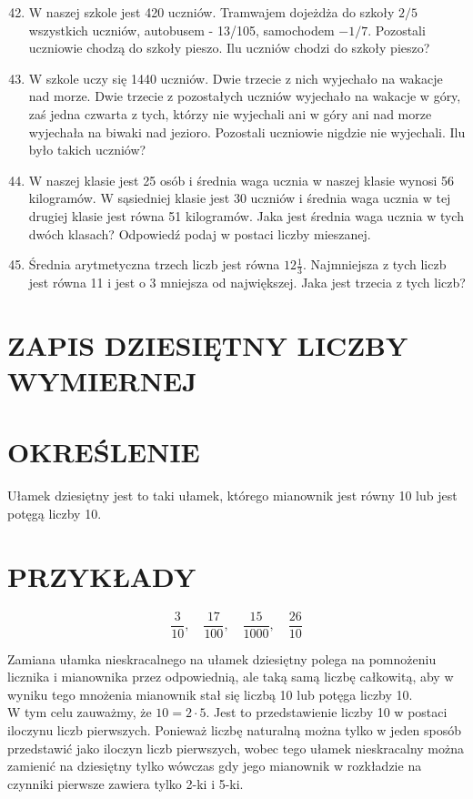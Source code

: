 \documentclass[10pt]{article}
\begin{document}
\begin{enumerate}
  \setcounter{enumi}{41}
  \item W naszej szkole jest 420 uczniów. Tramwajem dojeżdża do szkoły \(2 / 5\) wszystkich uczniów, autobusem - 13/105, samochodem \(-1 / 7\). Pozostali uczniowie chodzą do szkoły pieszo. Ilu uczniów chodzi do szkoły pieszo?
  \item W szkole uczy się 1440 uczniów. Dwie trzecie z nich wyjechało na wakacje nad morze. Dwie trzecie z pozostałych uczniów wyjechało na wakacje w góry, zaś jedna czwarta z tych, którzy nie wyjechali ani w góry ani nad morze wyjechała na biwaki nad jezioro. Pozostali uczniowie nigdzie nie wyjechali. Ilu było takich uczniów?
  \item W naszej klasie jest 25 osób i średnia waga ucznia w naszej klasie wynosi 56 kilogramów. W sąsiedniej klasie jest 30 uczniów i średnia waga ucznia w tej drugiej klasie jest równa 51 kilogramów. Jaka jest średnia waga ucznia w tych dwóch klasach? Odpowiedź podaj w postaci liczby mieszanej.
  \item Średnia arytmetyczna trzech liczb jest równa \(12 \frac{1}{3}\). Najmniejsza z tych liczb jest równa 11 i jest o 3 mniejsza od największej. Jaka jest trzecia z tych liczb?
\end{enumerate}

\section*{ZAPIS DZIESIĘTNY LICZBY WYMIERNEJ}
\section*{OKREŚLENIE}
Ułamek dziesiętny jest to taki ułamek, którego mianownik jest równy 10 lub jest potęgą liczby 10.

\section*{PRZYKŁADY}
\[
\frac{3}{10}, \quad \frac{17}{100}, \quad \frac{15}{1000}, \quad \frac{26}{10}
\]

Zamiana ułamka nieskracalnego na ułamek dziesiętny polega na pomnożeniu licznika i mianownika przez odpowiednią, ale taką samą liczbę całkowitą, aby w wyniku tego mnożenia mianownik stał się liczbą 10 lub potęga liczby 10.\\
W tym celu zauważmy, że \(10=2 \cdot 5\). Jest to przedstawienie liczby 10 w postaci iloczynu liczb pierwszych. Ponieważ liczbę naturalną można tylko w jeden sposób przedstawić jako iloczyn liczb pierwszych, wobec tego ułamek nieskracalny można zamienić na dziesiętny tylko wówczas gdy jego mianownik w rozkładzie na czynniki pierwsze zawiera tylko 2-ki i 5-ki.
\end{document}
